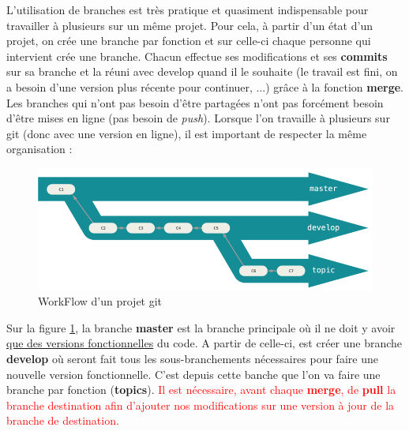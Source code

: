 \documentclass[12pt]{article}
\begin{document}
L'utilisation de branches est très pratique et quasiment indispensable pour travailler à plusieurs sur un même projet. Pour cela, à partir d'un état d'un projet, on crée une branche par fonction et sur celle-ci chaque personne qui intervient crée une branche. Chacun effectue ses modifications et ses \textbf{commits} sur sa branche et la réuni avec develop  quand il le souhaite (le travail est fini, on a besoin d'une version plus récente pour continuer, ...) grâce à la fonction \textbf{merge}. Les branches qui n'ont pas besoin d'être partagées n'ont pas forcément besoin d'être mises en ligne (pas besoin de \emph{push}). 
\newpage
Lorsque l'on travaille à plusieurs sur git (donc avec une version en ligne), il est important de respecter la même organisation :
\begin{figure}[!ht]
\centering
\includegraphics[width=15cm]{./gitSchema.png}
\caption{\label{fig:workflow}WorkFlow d'un projet git}
\end{figure}

Sur la figure \ref{fig:workflow}, la branche \textbf{master} est la branche principale où il ne doit y avoir \ul{que des versions fonctionnelles} du code. A partir de celle-ci, est créer une branche \textbf{develop} où seront fait tous les sous-branchements nécessaires pour faire une nouvelle version fonctionnelle. C'est depuis cette banche que l'on va faire une branche par fonction (\textbf{topics}). \textcolor{red}{Il est nécessaire, avant chaque \textbf{merge}, de \textbf{pull} la branche destination afin d'ajouter nos modifications sur une version à jour de la branche de destination.}
\end{document}
